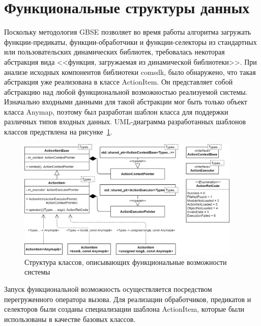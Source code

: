 \section{Функциональные структуры данных}\label{sec:functional_classes}
Поскольку методология GBSE позволяет во время работы алгоритма загружать функции-предикаты, функции-обработчики и функции-селекторы из стандартных или пользовательских динамических библиотек, требовалась некоторая абстракция вида <<функция, загружаемая из динамической библиотеки>>. При анализе исходных компонентов библиотеки comsdk, было обнаружено, что такая абстракция уже реализована в классе \textsf{ActionItem}. Он представляет собой абстракцию над любой функциональной возможностью реализуемой системы. Изначально входными данными для такой абстракции мог быть только объект класса \textsf{Anymap}, поэтому был разработан шаблон класса для поддержки различных типов входных данных. UML-диаграмма разработанных шаблонов классов предствлена на рисунке~\ref{fig:UMLActionItems}.
\begin{figure}[!ht]
    \centering
    \includegraphics[width=0.95\textwidth]{figures/UML.actionItem.png}
    \caption{Структура классов, описывающих функциональные возможности системы}
    \label{fig:UMLActionItems}
\end{figure}
Запуск функциональной возможность осуществляется посредством перегруженного оператора вызова. Для реализации обработчиков, предикатов и селекторов были созданы специализации шаблона \textsf{ActionItem}, которые были использованы в качестве базовых классов.

